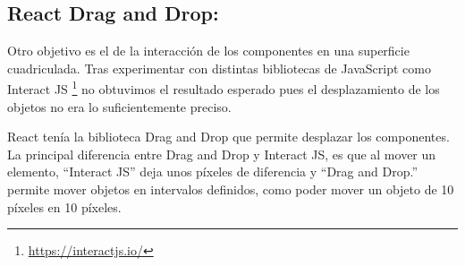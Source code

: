 \subsection{React Drag and Drop:}

Otro objetivo es el de la interacción de los componentes en una superficie cuadriculada. Tras experimentar con distintas bibliotecas de JavaScript como Interact JS \footnote{\url{https://interactjs.io/}} no obtuvimos el resultado esperado pues el desplazamiento de los objetos no era lo suficientemente preciso.

React tenía la biblioteca Drag and Drop que permite desplazar los componentes. La principal diferencia entre Drag and Drop y Interact JS, es que al mover un elemento, “Interact JS”  deja unos píxeles de diferencia y “Drag and Drop.” permite mover objetos en intervalos definidos, como poder mover un objeto de 10 píxeles en 10 píxeles.